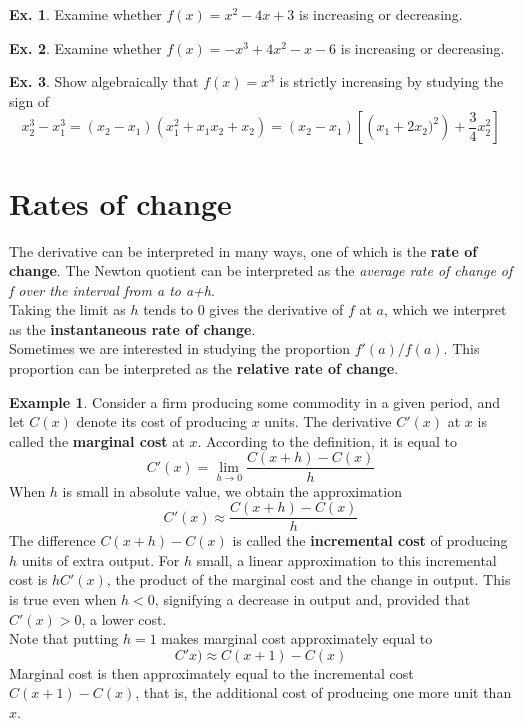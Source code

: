 \documentclass[10pt,a4paper]{book}
\theoremstyle{definition}\newtheorem{definition}{Definition}
\theoremstyle{definition}\newtheorem{fact}{Fact}
\theoremstyle{definition}\newtheorem{ex}{Ex.}
\theoremstyle{definition}\newtheorem{project}{Project}
\theoremstyle{definition}\newtheorem{problem}{Problem}
\theoremstyle{definition}\newtheorem{example}{Example}
\numberwithin{theorem}{chapter}
\numberwithin{corollary}{chapter}
\numberwithin{assumption}{chapter}
\numberwithin{definition}{chapter}
\numberwithin{prop}{chapter}
\numberwithin{notation}{chapter}
\numberwithin{problem}{chapter}
\numberwithin{example}{chapter}
\numberwithin{fact}{chapter}
\numberwithin{ex}{chapter}
\begin{document}
	\begin{ex}
		Examine whether $f (x) = x^2 - 4x + 3$ is increasing or decreasing.
	\end{ex}
	
	\begin{ex}
		Examine whether $f (x) = -x^3 + 4x^2 - x - 6$ is increasing or decreasing.
	\end{ex}
	
	\begin{ex}
		Show algebraically that $f (x) = x^3$ is strictly increasing by studying the sign of
		$$x_2^3 - x_1^3 =(x_2 - x_1)(x_1^2 +x_1x_2 +x_2)=(x_2 - x_1) \left[ \left(x_1 + 2x_2)^2 \right) + \frac{3}{4}x_2^2 \right]$$
	\end{ex}
	
	\section{Rates of change}
	The derivative can be interpreted in many ways, one of which is the \textbf{rate of change}. The Newton quotient can be interpreted as the \textit{average rate of change of f over the interval from a to a+h}.
	\\
	Taking the limit as $h$ tends to 0 gives the derivative of $f$ at $a$, which we interpret as the \textbf{instantaneous rate of change}.
	\\
	Sometimes we are interested in studying the proportion $f'(a)/f(a)$. This proportion can be interpreted as the \textbf{relative rate of change}.
	
	\begin{example}
		Consider a firm producing some commodity in a given period, and let $C(x)$ denote its cost of producing $x$ units. The derivative $C'(x)$ at $x$ is called the \textbf{marginal cost} at $x$. According to the definition, it is equal to
		$$C'(x) = \lim_{h \rightarrow 0} \frac{C(x + h) - C(x)}{h}$$
		When $h$ is small in absolute value, we obtain the approximation $$C'(x) \approx \frac{ C(x + h) - C(x)}{h}$$
		The difference $C(x + h) - C(x)$ is called the \textbf{incremental cost} of producing $h$ units of extra output. For $h$ small, a linear approximation to this incremental cost is $hC'(x)$, the product of the marginal cost and the change in output. This is true even when $h < 0$, signifying a decrease in output and, provided that $C'(x) > 0$, a lower cost.
		\\
		Note that putting $h = 1$ makes marginal cost approximately equal to
		$$C'x) \approx C(x + 1) - C(x)$$
		Marginal cost is then approximately equal to the incremental cost $C(x + 1) - C(x)$, that is, the additional cost of producing one more unit than $x$.
	\end{example}
	
\end{document}
